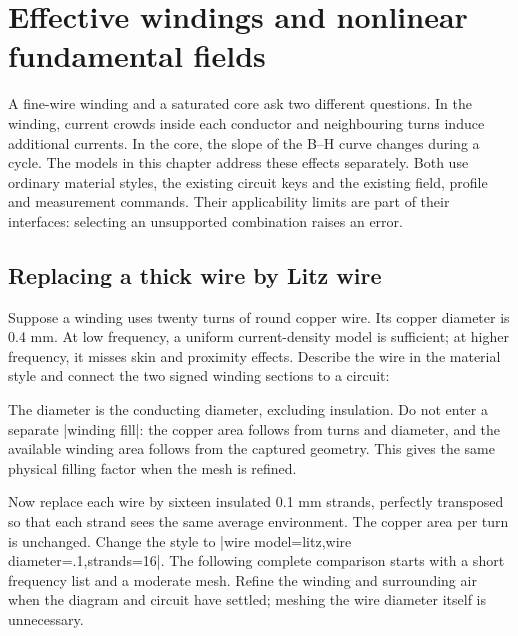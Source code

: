 \section{Effective windings and nonlinear fundamental fields}
\label{sec:harmonic-material-models}

A fine-wire winding and a saturated core ask two different questions. In the
winding, current crowds inside each conductor and neighbouring turns induce
additional currents. In the core, the slope of the B--H curve changes during a
cycle. The models in this chapter address these effects separately. Both use
ordinary material styles, the existing circuit keys and the existing field,
profile and measurement commands. Their applicability limits are part of their
interfaces: selecting an unsupported combination raises an error.

\subsection{Replacing a thick wire by Litz wire}
Suppose a winding uses twenty turns of round copper wire. Its copper diameter
is 0.4 mm. At low frequency, a uniform current-density model is sufficient;
at higher frequency, it misses skin and proximity effects. Describe the wire
in the material style and connect the two signed winding sections to a circuit:
\begin{codeexample}
\end{codeexample}
The diameter is the conducting diameter, excluding insulation. Do not enter a
separate |winding fill|: the copper area follows from turns and diameter, and
the available winding area follows from the captured geometry. This gives the
same physical filling factor when the mesh is refined.

Now replace each wire by sixteen insulated 0.1 mm strands, perfectly transposed
so that each strand sees the same average environment. The copper area per turn
is unchanged. Change the style to |wire model=litz,wire diameter=.1,strands=16|.
The following complete comparison starts with a short frequency list and a
moderate mesh. Refine the winding and surrounding air when the diagram and
circuit have settled; meshing the wire diameter itself is unnecessary.

